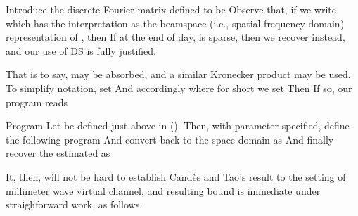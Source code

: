 \stopsection

\startsection [title={Proposed Method}]

Introduce the discrete Fourier matrix  defined to be
%
%
Observe that, if we write
%
%
which has the interpretation as the beamspace (i.e., spatial frequency domain) representation of , then
%
%
If at the end of day,  is sparse, then we recover  instead, and our use of DS is fully justified.

That is to say,  may be absorbed, and a similar Kronecker product may be used.
To simplify notation, set
%
%
And accordingly
where for short we set
%
Then
%
%
If so, our program reads

\Result
{Program}
{
Let  be defined just above in ().
Then, with parameter \m{\gamma} specified, define the following program
%
%
And convert  back to the space domain as
%
%
And finally recover the estimated  as
%
%
}

It, then, will not be hard to establish Cand\`es and Tao's result to the setting of millimeter wave virtual channel, and resulting bound is immediate under straighforward work, as follows.

\stopsection

\stopchapter
